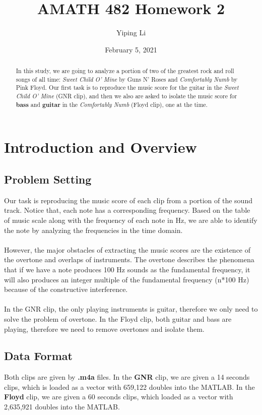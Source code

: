 \documentclass{article}
\title{AMATH 482 Homework 2}
\author{Yiping Li}
\date{February 5, 2021}
\begin{document}
\maketitle

\begin{abstract}
    In this study, we are going to analyze a portion of two of the greatest rock and roll songs of all time: \textit{Sweet Child O' Mine} by Guns N' Roses and \textit{Comfortably Numb} by Pink Floyd. Our first task is to reproduce the music score for the guitar in the \textit{Sweet Child O' Mine} (GNR clip), and then we also are asked to isolate the music score for \textbf{bass} and \textbf{guitar} in the \textit{Comfortably Numb} (Floyd clip), one at the time.
\end{abstract}

\section{Introduction and Overview}
\subsection{Problem Setting}
Our task is reproducing the music score of each clip from a portion of the sound track. Notice that, each note has a corresponding frequency. Based on the table of music scale along with the frequency of each note in Hz, we are able to identify the note by analyzing the frequencies in the time domain. \\
~\\
However, the major obstacles of extracting the music scores are the existence of the overtone and overlaps of instruments. The overtone describes the phenomena that if we have a note produces 100 Hz sounds as the fundamental frequency, it will also produces an integer multiple of the fundamental frequency (n*100 Hz) because of the constructive interference. \\
~\\
In the GNR clip, the only playing instruments is guitar, therefore we only need to solve the problem of overtone. In the Floyd clip, both guitar and bass are playing, therefore we need to remove overtones and isolate them.

\subsection{Data Format}
Both clips are given by \textbf{.m4a} files. In the \textbf{GNR} clip, we are given a 14 seconds clips, which is loaded as a vector with 659,122 doubles into the MATLAB. In the \textbf{Floyd} clip, we are given a 60 seconds clips, which loaded as a vector with 2,635,921 doubles into the MATLAB.
\end{document}
